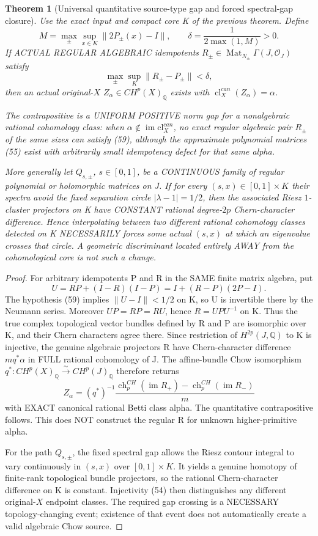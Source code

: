 \documentclass[11pt]{article}
\newtheorem{theorem}{Theorem}[section]
\begin{document}
\begin{theorem}[Universal quantitative source-type gap and forced spectral-gap closure]
Use the exact input and compact core K
of the previous theorem. Define
\[
 M=\max_{\pm}\sup_{x\in K}
       \|2P_\pm(x)-I\|,\qquad
 \delta=\frac{1}{2\max(1,M)}>0 .
\]
If ACTUAL REGULAR ALGEBRAIC idempotents
$R_\pm\in\operatorname{Mat}_{N_\pm}
\Gamma(J,\mathcal O_J)$ satisfy
\[
 \boxed{\max_\pm\sup_K\|R_\pm-P_\pm\|<\delta,} \tag{59}
\]
then an actual original-$X$
$Z_\alpha\in CH^p(X)_{\mathbb Q}$
exists with
$\operatorname{cl}^{can}_X(Z_\alpha)=\alpha$.

The contrapositive is a UNIFORM POSITIVE
norm gap for a nonalgebraic rational
cohomology class: when
$\alpha\notin\operatorname{im}
\mathrm{cl}^{can}_X$,
no exact regular algebraic pair
$R_\pm$ of the same sizes can
satisfy (59), although the
approximate polynomial matrices (55)
exist with arbitrarily small
idempotency defect for that
same alpha.

More generally let $Q_{s,\pm}$,
$s\in[0,1]$, be a CONTINUOUS family
of regular polynomial or holomorphic
matrices on J. If for every
$(s,x)\in[0,1]\times K$ their spectra
avoid the fixed separation circle
$|\lambda-1|=1/2$, then the associated
Riesz $1$-cluster projectors on K have
CONSTANT rational degree-$2p$
Chern-character difference.
Hence interpolating between two
different rational cohomology classes
detected on K NECESSARILY forces
some actual $(s,x)$ at which an
eigenvalue crosses that circle.
A geometric discriminant located
entirely AWAY from the cohomological
core is not such a change.
\end{theorem}
\begin{proof}
For arbitrary idempotents P and R
in the SAME finite matrix algebra, put
\[
 U=RP+(I-R)(I-P)
   =I+(R-P)(2P-I).
\]
The hypothesis (59) implies
$\|U-I\|<1/2$ on K, so
U is invertible there by the
Neumann series. Moreover
$UP=RP=RU$, hence
$R=UPU^{-1}$ on K.
Thus the true complex topological
vector bundles defined by R and P
are isomorphic over K, and their
Chern characters agree there.
Since restriction of $H^{2p}(J,\mathbb Q)$
to K is injective, the genuine
algebraic projectors R have
Chern-character difference
$m q^*\alpha$ in FULL rational
cohomology of J.
The affine-bundle Chow isomorphism
$q^*:CH^p(X)_{\mathbb Q}
 \overset\sim\longrightarrow
 CH^p(J)_{\mathbb Q}$
therefore returns
\[
 Z_\alpha=(q^*)^{-1}
 \frac{\operatorname{ch}^{CH}_p(\operatorname{im}R_+)
       -\operatorname{ch}^{CH}_p(\operatorname{im}R_-)}m
\]
with EXACT canonical rational Betti class alpha.
The quantitative contrapositive follows.
This does NOT construct the regular R for
unknown higher-primitive alpha.

For the path $Q_{s,\pm}$,
the fixed spectral gap allows
the Riesz contour integral to vary
continuously in $(s,x)$ over
$[0,1]\times K$.
It yields a genuine homotopy
of finite-rank topological bundle
projectors, so the rational
Chern-character difference on K
is constant. Injectivity (54)
then distinguishes any different
original-$X$ endpoint classes.
The required gap crossing is
a NECESSARY topology-changing
event; existence of that event
does not automatically create
a valid algebraic Chow source.
\end{proof}
\end{document}
